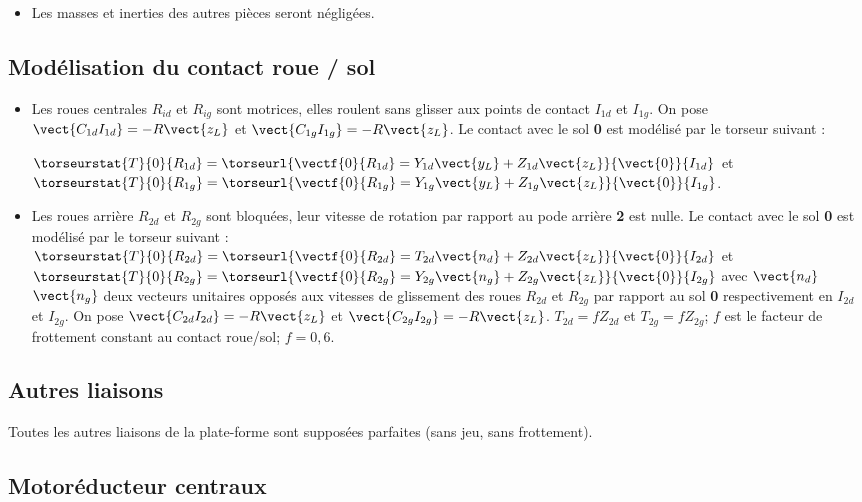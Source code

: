 \begin{itemize}
\item Les masses et inerties des autres pièces seront négligées.
\end{itemize}
\fi
\subsection*{Modélisation du contact roue / sol}
\ifprof
\else

\begin{itemize}
\item Les roues centrales $R_{id}$ et $R_{ig}$ sont motrices, elles roulent sans glisser aux points de contact $I_{1d}$ et $I_{1g}$. On pose $\vect{C_{1d}I_{1d}}=-R\vect{z_L}$ et $\vect{C_{1g}I_{1g}}=-R\vect{z_L}$. Le contact avec le sol \textbf{0} est modélisé par le torseur suivant :

$\torseurstat{T}{0}{R_{1d}}=\torseurl{\vectf{0}{R_{1d}}=Y_{1d}\vect{y_L}+Z_{1d}\vect{z_L}}{\vect{0}}{I_{1d}}$
et
$\torseurstat{T}{0}{R_{1g}}=\torseurl{\vectf{0}{R_{1g}}=Y_{1g}\vect{y_L}+Z_{1g}\vect{z_L}}{\vect{0}}{I_{1g}}$.

\item Les roues arrière $R_{2d}$ et $R_{2g}$ sont bloquées, leur vitesse de rotation par rapport au pode arrière \textbf{2} est nulle. Le contact avec le sol \textbf{0} est modélisé par le torseur suivant : 
$\torseurstat{T}{0}{R_{2d}}=\torseurl{\vectf{0}{R_{2d}}=T_{2d}\vect{n_d}+Z_{2d}\vect{z_L}}{\vect{0}}{I_{2d}}$
et
$\torseurstat{T}{0}{R_{2g}}=\torseurl{\vectf{0}{R_{2g}}=Y_{2g}\vect{n_g}+Z_{2g}\vect{z_L}}{\vect{0}}{I_{2g}}$
avec $\vect{n_d}$ $\vect{n_g}$ deux vecteurs unitaires opposés aux vitesses de glissement des roues $R_{2d}$ et $R_{2g}$ par rapport au sol \textbf{0}
respectivement en $I_{2d}$ et $I_{2g}$. On pose $\vect{C_{2d}I_{2d}}=-R\vect{z_L}$ et 
$\vect{C_{2g}I_{2g}}=-R\vect{z_L}$. $T_{2d}=fZ_{2d}$ et $T_{2g}=fZ_{2g}$; $f$ est le facteur de frottement constant au contact roue/sol; $f = 0,6$.
\end{itemize}
\fi

\subsection*{Autres liaisons}
Toutes les autres liaisons de la plate-forme sont supposées parfaites (sans jeu, sans frottement).

\subsection*{Motoréducteur centraux}
\ifprof
\else

